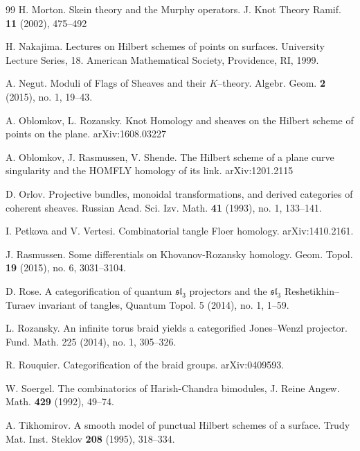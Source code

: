 \documentclass[12pt]{amsart}
\numberwithin{equation}{section}
\theoremstyle{definition}
\theoremstyle{remark}
\renewcommand{\1}{\mathbf{1}}
\newcommand{\fsl}{\mathfrak{sl}}
\begin{document}
\begin{thebibliography}{99}
 H. Morton. Skein theory and the Murphy operators.  J. Knot Theory Ramif. {\bf 11} (2002), 475--492

 H. Nakajima. Lectures on Hilbert schemes of points on surfaces. University Lecture Series, 18. American Mathematical Society, Providence, RI, 1999. 

 A. Negu\cb t. Moduli of Flags of Sheaves and their $K$--theory.
 Algebr. Geom. {\bf 2} (2015), no. 1, 19--43.
 
 A. Oblomkov, L. Rozansky. Knot Homology and sheaves on the Hilbert scheme of points on the plane.
arXiv:1608.03227

 A. Oblomkov, J. Rasmussen, V. Shende. The Hilbert scheme of a plane curve singularity and the HOMFLY homology of its link.
arXiv:1201.2115
 
 D. Orlov. Projective bundles, monoidal transformations, and derived categories of coherent sheaves.
Russian Acad. Sci. Izv. Math. {\bf 41} (1993), no. 1, 133--141. 

 I. Petkova and V. Vertesi. Combinatorial tangle Floer homology. arXiv:1410.2161.
 
 J. Rasmussen. Some differentials on Khovanov-Rozansky homology.
Geom. Topol. {\bf 19} (2015), no. 6, 3031--3104.

 D. Rose.  A categorification of quantum $\fsl_3$ projectors and the $\fsl_3$ Reshetikhin--Turaev invariant of tangles,
Quantum Topol. 5 (2014), no. 1, 1--59. 

 L. Rozansky.  An infinite torus braid yields a categorified Jones--Wenzl projector.  Fund. Math. 225 (2014), no. 1, 305--326. 

 R. Rouquier. Categorification of the braid groups. arXiv:0409593.

 W. Soergel. The combinatorics of Harish-Chandra bimodules, J. Reine Angew. Math. {\bf 429} (1992), 49--74.

 A. Tikhomirov. A smooth model of punctual Hilbert schemes of a surface. Trudy Mat. Inst. Steklov {\bf 208} (1995),
318--334.

\end{thebibliography}
\end{document}
